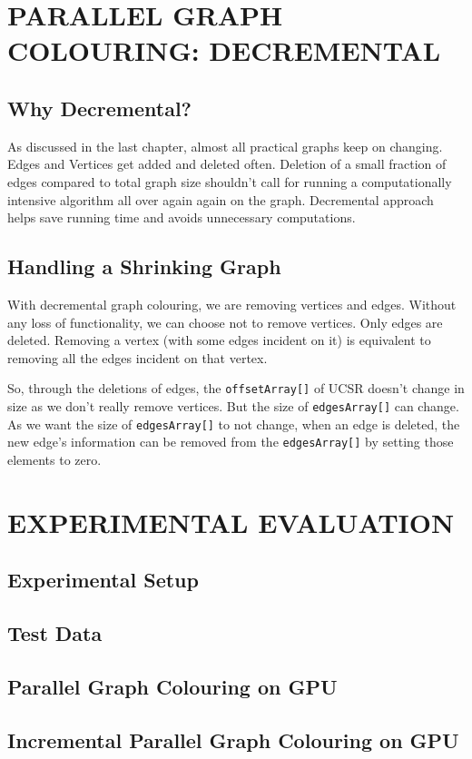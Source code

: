 \documentclass[MTech]{iitmdiss}
\begin{document}
\chapter{PARALLEL GRAPH COLOURING: DECREMENTAL}
\section{Why Decremental?}
As discussed in the last chapter, almost all practical graphs keep on changing. Edges and Vertices get added and deleted often. Deletion of a small fraction of edges compared to total graph size shouldn't call for running a computationally intensive algorithm all over again again on the graph. Decremental approach helps save running time and avoids unnecessary computations.

\section{Handling a Shrinking Graph}
With decremental graph colouring, we are removing vertices and edges. Without any loss of functionality, we can choose not to remove vertices. Only edges are deleted. Removing a vertex (with some edges incident on it) is equivalent to removing all the edges incident on that vertex. 

So, through the deletions of edges, the \verb+offsetArray[]+ of UCSR doesn't change in size as we don't really remove vertices. But the size of \verb+edgesArray[]+ can change. As we want the size of \verb+edgesArray[]+ to not change, when an edge is deleted, the new edge's information can be removed from the \verb+edgesArray[]+ by setting those elements to zero.
\chapter{EXPERIMENTAL EVALUATION}
\section{Experimental Setup}
\section{Test Data}
\section{Parallel Graph Colouring on GPU}
\section{Incremental Parallel Graph Colouring on GPU}
\end{document}
